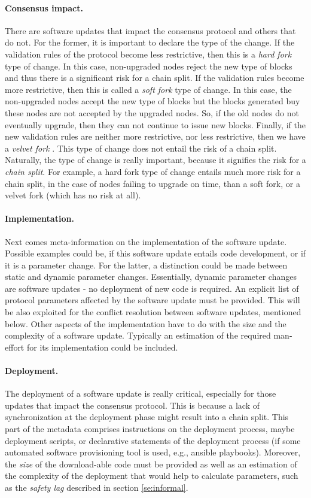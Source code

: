 \paragraph{Consensus impact.} There are software updates that impact the consensus protocol and others that do not. For the former, it is important to declare the type of the change. If the validation rules of the protocol become less restrictive, then this is a \emph{hard fork} type of change. In this case, non-upgraded nodes reject the new type of blocks and thus there is a significant risk for a chain split. If the validation rules become more restrictive, then this is called a \emph{soft fork} type of change. In this case, the non-upgraded nodes accept the new type of blocks but the blocks generated buy these nodes are not accepted by the upgraded nodes. So, if the old nodes do not eventually upgrade, then they can not continue to issue new blocks. Finally, if the new validation rules are neither more restrictive, nor less restrictive, then we have a \emph{velvet fork} \cite{velvet}. This type of change does not entail the risk of a chain split. Naturally, the type of change is really important, because it signifies the risk for a \emph{chain split}. For example, a hard fork type of change entails much more risk for a chain split, in the case of nodes failing to upgrade on time, than a soft fork, or a velvet fork (which has no risk at all).
\paragraph{Implementation.} Next comes meta-information on the implementation of the software update. Possible examples could be, if this software update entails code development, or if it is a parameter change. For the latter, a distinction could be made between static and dynamic parameter changes. Essentially, dynamic parameter changes are  software updates - no deployment of new code is required. An explicit list of protocol parameters affected by the software update must be provided. This will be also exploited for the conflict resolution between software updates, mentioned below. Other aspects of the implementation have to do with the size and the complexity of a software update. Typically an estimation of the required man-effort for its implementation could be included.
\paragraph{Deployment.} The deployment of a software update is really critical, especially for those updates that impact the consensus protocol. This is because a lack of synchronization at the deployment phase might result into a chain split. This part of the metadata comprises instructions on the deployment process, maybe deployment scripts, or declarative statements of the deployment process (if some automated software provisioning tool is used, e.g., ansible playbooks). Moreover, the \emph{size} of the download-able code must be provided as well as an estimation of the complexity of the deployment that would help to calculate parameters, such as the \emph{safety lag} described in section \ref{se:informal}.

